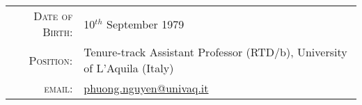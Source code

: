 \documentclass[a4paper,8pt]{article} %
\begin{document}
\begin{tabular}{rl}
\textsc{Date of Birth:}             & 10$^{th}$ September 1979 \\
\textsc{Position:}               & Tenure-track Assistant Professor (RTD/b), University of L'Aquila (Italy) \\
\textsc{email:} 					& \href{mailto:phuong.nguyen@univaq.it}{phuong.nguyen@univaq.it} \\ %
\end{tabular}
%
%
%
%
\end{document}
